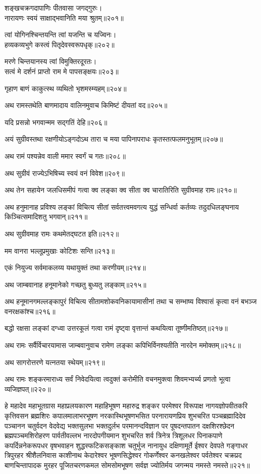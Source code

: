 \begin{flushleft}
शङ्खचक्रगदापाणिः पीतवासा जगद्गुरुः।\\
नारायणः स्वयं साक्षाद्भवानिति मया श्रुतम्॥२०१॥

त्वां योगिनश्चिन्तयन्ति त्वां यजन्ति च यज्विनः।\\
हव्यकव्यभुगे कस्त्वं पितृदेवस्वरूपधृक्॥२०२॥

मरणे चिन्तयानस्य त्वां विमुक्तिरदूरतः।\\
सत्वं मे दर्शनं प्राप्तो राम मे पापसङ्क्षयः॥२०३॥

गृहाण बाणं काकुत्स्थ व्यथितो भृशमस्म्यहम्॥२०४॥

अथ रामस्तथेति बाणमादाय वालिनमुवाच किमिष्टं दीयतां वद॥२०५॥


यदि प्रसन्नो भगवान्मम सद्गतिं देहि॥२०६॥

अयं सुग्रीवस्तथा रक्षणीयोऽङ्गदोऽथ तारा च मया पापिनापराधः कृतस्तत्फलमनुभूतम्॥२०७॥

अथ रामं पश्यन्नेव वाली ममार स्वर्गं च गतः॥२०८॥

अथ सुग्रीवं राज्येऽभिषिच्य स्वयं वनं विवेश॥२०९॥

अथ तेन सहायेन जलधिसमीपं गत्वा क्व लङ्का क्व सीता क्व चारातिरिति सुग्रीवमाह रामः॥२१०॥

अथ हनुमानाह प्रविश्य लङ्कां विचित्य सीतां सर्वतत्त्वमवगत्य युद्धं सन्धिर्वा कर्तव्यः तदुदधिलङ्घनाय किञ्चित्समादिशतु भगवान्॥२११॥

अथ सुग्रीवमाह रामः कथमेतद्घटत इति॥२१२॥


मम वानरा भल्लूप्रमुखाः कोटिशः सन्ति॥२१३॥

एकं नियुज्य सर्वमाकलय्य यथायुक्तं तथा करणीयम्॥२१४॥

अथ जाम्बवानाह हनूमानेको गच्छतु बुध्यतु लङ्काम्॥२१५॥

अथ हनूमानगमल्लङ्कापुरं विचित्य सीतामशोकवनिकायामासीनां तथा च सम्भाष्य विश्वासं कृत्वा वनं बभञ्ज वनरक्षकांश्च॥२१६॥

बद्धो रक्षसा लङ्कां दग्ध्वा उत्तरकूलं गत्वा रामं दृष्ट्वा वृत्तान्तं कथयित्वा तूष्णीमतिष्ठत्॥२१७॥

अथ रामः सर्वैर्विचारयामास जाम्बवानुवाच रामेण लङ्का कपिभिर्विनश्यतीति नारदेन ममोक्तम्॥२१८॥

अथ सागरोत्तरणे यत्नतया स्थेयम्॥२१९॥

अथ रामः शङ्करमाराध्य सर्वं निवेदयित्वा त्वदुक्तं करोमीति वचनमुक्त्वा शिवमभ्यर्च्य प्रणतो भूत्वा व्यजिज्ञपत्॥२२०॥

हे महादेव महाभूतग्रास महाप्रलयकारण महाहिभूषण महारुद्र शङ्कर परमेश्वर विरूपाक्ष नागयज्ञोपवीतकरि कृत्तिवसन ब्रह्मशिरः कपालमालाभरभूषण नरकास्थिभूषणभसित परनारायणप्रिय शुभचरित पञ्चब्रह्मादिदेव पञ्चानन चतुर्वदन वेदवेद्य भक्तसुलभा भक्तदुर्लभ परमानन्दविज्ञान पर पूषदन्तपातन दक्षशिरश्छेदन ब्रह्मपञ्चमशिरोहरण पार्वतीवल्लभ नारदोपगीयमान शुभचरित शर्व त्रिनेत्र त्रिशूलधर पिनाकपाणे कपर्दिन्ननेकरूपधर वृषभवाहन शुद्धस्फटिकसङ्काश चतुर्भुज नानायुध दक्षिणामूर्ते ईश्वर देवपते गङ्गाधर त्रिपुरहर श्रीशैलनिवास काशीनाथ केदारेश्वर भूषणसिद्धेश्वर गोकर्णेश्वर कनखलेश्वर पर्वतेश्वर चक्रप्रद बाणचिन्तापादक मुरहर पूजितचरणकमल सोमसोमभूषण सर्वज्ञ ज्योतिर्मय जगन्मय नमस्ते नमस्ते॥२२१॥


\end{flushleft}
